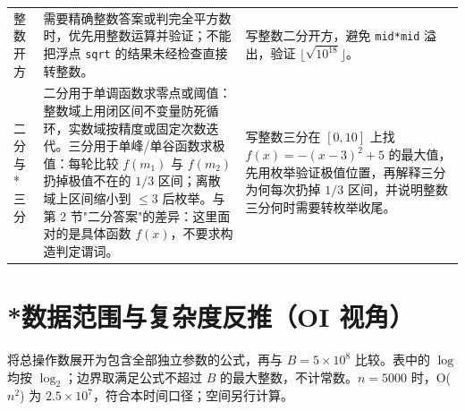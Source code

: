 \documentclass[a4paper,11pt]{article}
\newcommand{\code}[1]{\texttt{#1}}
\begin{document}
\begin{longtable}{L{2.4cm} L{7.5cm} L{6.8cm}}
整数开方
& 需要精确整数答案或判完全平方数时，优先用整数运算并验证；不能把浮点 \code{sqrt} 的结果未经检查直接转整数。
& 写整数二分开方，避免 \code{mid*mid} 溢出，验证 $\lfloor\sqrt{10^{18}}\rfloor$。 \\[2mm]

二分与*三分
& 二分用于单调函数求零点或阈值：整数域上用闭区间不变量防死循环，实数域按精度或固定次数迭代。三分用于单峰/单谷函数求极值：每轮比较 $f(m_1)$ 与 $f(m_2)$ 扔掉极值不在的 $1/3$ 区间；离散域上区间缩小到 $\le 3$ 后枚举。与第 2 节"二分答案"的差异：这里面对的是具体函数 $f(x)$，不要求构造判定谓词。
& 写整数三分在 $[0,10]$ 上找 $f(x)=-(x-3)^2+5$ 的最大值，先用枚举验证极值位置，再解释三分为何每次扔掉 $1/3$ 区间，并说明整数三分何时需要转枚举收尾。 \\
\end{longtable}
\endgroup

\newpage
\section{*数据范围与复杂度反推（OI 视角）}

将总操作数展开为包含全部独立参数的公式，再与 $B=5\times10^8$ 比较。表中的 $\log$ 均按 $\log_2$；边界取满足公式不超过 $B$ 的最大整数，不计常数。$n=5000$ 时，O($n^2$) 为 $2.5\times10^7$，符合本时间口径；空间另行计算。
\end{document}
